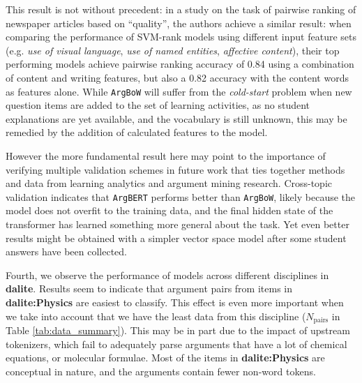 \documentclass[runningheads]{llncs}
\begin{document}
This result is not without precedent: in a study on the task of pairwise 
ranking of newspaper articles based on ``quality'', the authors achieve a 
similar result: when comparing the performance of SVM-rank models using 
different input feature sets (e.g. \textit{use of visual language}, \textit{use 
of named entities}, \textit{affective content}), their top performing models 
achieve pairwise ranking accuracy of 0.84 using a combination of content and 
writing features, but also a 0.82 accuracy with the content words as features 
alone\cite{louis_what_2013}.
While \verb|ArgBoW| will suffer from the \textit{cold-start} problem when new 
question items are added to the set of learning activities, as no student 
explanations are yet available, and the vocabulary is still unknown, this may 
be remedied by the addition of calculated features to the model.

However the more fundamental result here may point to the importance of 
verifying multiple validation schemes in future work that ties together methods 
and data from learning analytics and argument mining research. 
Cross-topic validation indicates that \verb|ArgBERT| performs better than 
\verb|ArgBoW|, likely because the model does not overfit to the training data, 
and the final hidden state of the transformer has learned something more 
general about the task.
Yet even better results might be obtained with a simpler vector space model 
after some student answers have been collected.

Fourth, we observe the performance of models across different disciplines in 
\textbf{dalite}. 
Results seem to indicate that argument pairs from items in 
\textbf{dalite:Physics} are easiest to classify.
This effect is even more important when we take into account that we have the 
least data from this discipline ($N_{\mathrm{pairs}}$ in Table \ref{tab:data_summary}).
This may be in part due to the impact of upstream tokenizers, which fail to 
adequately parse arguments that have a lot of chemical equations, or molecular 
formulae.
Most of the items in \textbf{dalite:Physics} are conceptual in nature, and 
the 
arguments contain fewer non-word tokens.
 
\end{document}
